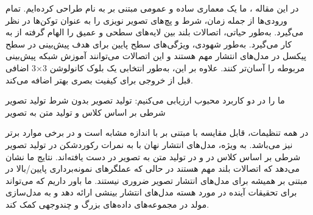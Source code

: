 در این مقاله ، ما یک معماری ساده و عمومی مبتنی بر  به نام  طراحی کرده‌ایم.  تمام ورودی‌ها از جمله زمان، شرط و پچ‌های تصویر نویزی را به عنوان توکن‌ها در نظر می‌گیرد. به‌طور حیاتی،  اتصالات بلند بین لایه‌های سطحی و عمیق را الهام گرفته از  به کار می‌گیرد. به‌طور شهودی، ویژگی‌های سطح پایین برای هدف پیش‌بینی در سطح پیکسل در مدل‌های انتشار مهم هستند و این اتصالات می‌توانند آموزش شبکه پیش‌بینی مربوطه را آسان‌تر کنند. علاوه بر این،  به‌طور انتخابی یک بلوک کانولوشن 3×3 اضافی قبل از خروجی برای کیفیت بصری بهتر اضافه می‌کند.

ما  را در دو کاربرد محبوب ارزیابی می‌کنیم:
 تولید تصویر بدون شرط
 تولید تصویر شرطی بر اساس کلاس و تولید متن به تصویر



در همه تنظیمات،  قابل مقایسه با  مبتنی بر  با اندازه مشابه است و در برخی موارد برتر نیز می‌باشد. به ویژه، مدل‌های انتشار نهان با  به نمرات  رکوردشکن  در تولید تصویر شرطی بر اساس کلاس در  و  در تولید متن به تصویر در  دست یافته‌اند. نتایج ما نشان می‌دهد که اتصالات بلند مهم هستند در حالی که عملگرهای نمونه‌برداری پایین/بالا در  مبتنی بر  همیشه برای مدل‌های انتشار تصویر ضروری نیستند. ما باور داریم که  می‌تواند برای تحقیقات آینده در مورد هسته مدل‌های انتشار بینشی ارائه دهد و به مدل‌سازی مولد در مجموعه‌های داده‌های بزرگ و چندوجهی کمک کند.